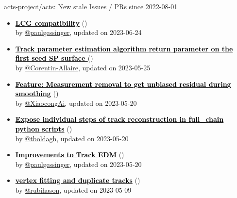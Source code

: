\begin{frame}[allowframebreaks]{ acts-project/acts: New stale Issues / PRs since 2022-08-01 }
\begin{itemize}
    \item\iss\prstale\textbf{\href{https://github.com/acts-project/acts/issues/2054}{\textcolor{black}{LCG compatibility}}}
    (\href{https://github.com/acts-project/acts/issues/2054}{}) \\
    by \href{https://github.com/paulgessinger}{@paulgessinger}, updated on 2023-06-24

    \item\iss\prstale\textbf{\href{https://github.com/acts-project/acts/issues/2037}{\textcolor{black}{Track parameter estimation algorithm return parameter on the first seed SP surface }}}
    (\href{https://github.com/acts-project/acts/issues/2037}{}) \\
    by \href{https://github.com/Corentin-Allaire}{@Corentin-Allaire}, updated on 2023-05-25

    \item\iss\prstale\textbf{\href{https://github.com/acts-project/acts/issues/2031}{\textcolor{black}{Feature: Measurement removal to get unbiased residual  during smoothing}}}
    (\href{https://github.com/acts-project/acts/issues/2031}{}) \\
    by \href{https://github.com/XiaocongAi}{@XiaocongAi}, updated on 2023-05-20

    \item\iss\prstale\textbf{\href{https://github.com/acts-project/acts/issues/1997}{\textcolor{black}{Expose individual steps of track reconstruction in full\_chain python scripts}}}
    (\href{https://github.com/acts-project/acts/issues/1997}{}) \\
    by \href{https://github.com/tboldagh}{@tboldagh}, updated on 2023-05-20

    \item\iss\prstale\textbf{\href{https://github.com/acts-project/acts/issues/1993}{\textcolor{black}{Improvements to Track EDM}}}
    (\href{https://github.com/acts-project/acts/issues/1993}{}) \\
    by \href{https://github.com/paulgessinger}{@paulgessinger}, updated on 2023-05-20

    \item\iss\prstale\textbf{\href{https://github.com/acts-project/acts/issues/1992}{\textcolor{black}{vertex fitting and duplicate tracks}}}
    (\href{https://github.com/acts-project/acts/issues/1992}{}) \\
    by \href{https://github.com/rubihason}{@rubihason}, updated on 2023-05-09


\end{itemize}
\end{frame}
